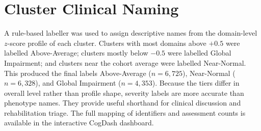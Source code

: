 \section{Cluster Clinical Naming}\label{sec:cluster_names}

A rule-based labeller was used to assign descriptive names from the domain-level $z$-score profile of each cluster. Clusters with most domains above $+0.5$ were labelled Above-Average; clusters mostly below $-0.5$ were labelled Global Impairment; and clusters near the cohort average were labelled Near-Normal. This produced the final labels Above-Average ($n = 6{,}725$), Near-Normal ($n = 6{,}328$), and Global Impairment ($n = 4{,}353$). Because the tiers differ in overall level rather than profile shape, severity labels are more accurate than phenotype names. They provide useful shorthand for clinical discussion and rehabilitation triage. The full mapping of identifiers and assessment counts is available in the interactive CogDash dashboard.
